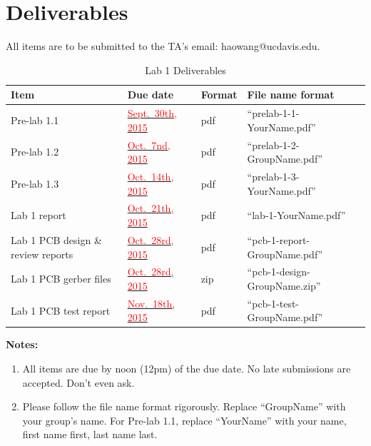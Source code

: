 \documentclass[letterpaper, 11pt]{article}
\newcommand{\due}[1]{\href{https://github.com/ucdart/UCD-EEC134/blob/master/support/schedule/eec134-schedule.pdf}{\textcolor{red}{#1}}}
\begin{document}
\newpage
\section{Deliverables}
All items are to be submitted to the TA's email: haowang@ucdavis.edu.  

\vspace{0.5cm}

\begin{table}[h]
	\footnotesize
	\caption{Lab 1 Deliverables}
	\renewcommand{\arraystretch}{1.2}
	\begin{tabular}{|m{1in}|l|m{0.45in}|m{2in}|}
		\hline
		\textbf{Item} & \textbf{Due date} & \textbf{Format} & \textbf{File name format} \\
		\hline \hline
		Pre-lab 1.1 & \due{Sept.~30th, 2015 } & pdf & ``prelab-1-1-YourName.pdf'' \\
		\hline
		Pre-lab 1.2 & \due{Oct.~7nd, 2015} & pdf & ``prelab-1-2-GroupName.pdf''\\
		\hline
		Pre-lab 1.3 & \due{Oct.~14th, 2015} & pdf & ``prelab-1-3-YourName.pdf''\\
		\hline
		Lab 1 report & \due{Oct.~21th, 2015} & pdf & ``lab-1-YourName.pdf''\\
		\hline
		Lab 1 PCB design \& review reports & \due{Oct.~28rd, 2015} & pdf & ``pcb-1-report-GroupName.pdf''\\
		\hline
		Lab 1 PCB gerber files & \due{Oct.~28rd, 2015} & zip & ``pcb-1-design-GroupName.zip''\\
		\hline
		Lab 1 PCB test report & \due{Nov.~18th, 2015} & pdf & ``pcb-1-test-GroupName.pdf''\\
		\hline
	\end{tabular}
	\label{tab:deliverables}
\end{table}

\textbf{Notes:}
\begin{enumerate}
	\item All items are due by noon (12pm) of the due date. No late submissions are accepted. Don't even ask. 
	
	\item Please follow the file name format rigorously. Replace ``GroupName'' with your group's name. For Pre-lab 1.1, replace ``YourName'' with your name, first name first, last name last. 
\end{enumerate}
\end{document}
